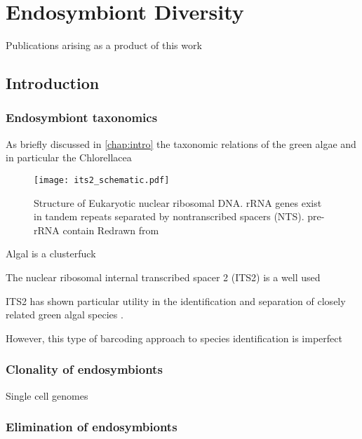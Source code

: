% 
\graphicspath{{chapters/3.Chapter_1/figures}}

\chapter{Endosymbiont Diversity}\label{chap:endo_diversity}

Publications arising as a product of this work \citep{Chambouvet2015} 

\section{Introduction}

\subsection{Endosymbiont taxonomics}

As briefly discussed in \ref{chap:intro} the taxonomic relations
of the green algae and in particular the Chlorellacea 



\begin{figure}[h]
    \texttt{[image: its2\_schematic.pdf]}
    \caption{Structure of Eukaryotic nuclear ribosomal DNA.
        rRNA genes exist in tandem repeats separated by nontranscribed spacers (NTS).
        pre-rRNA contain 
    Redrawn from \citep{}}
    \label{fig;its2_schematic]}
\end{figure}



Algal is a clusterfuck





The nuclear ribosomal internal transcribed spacer 2 (ITS2) is a well used


ITS2 has shown particular utility in the identification and separation
of closely related green algal species \citep{Buchheim2011}.


However, this type of barcoding approach to species identification is 
imperfect 

\subsection{Clonality of endosymbionts}

Single cell genomes


\subsection{Elimination of endosymbionts}

